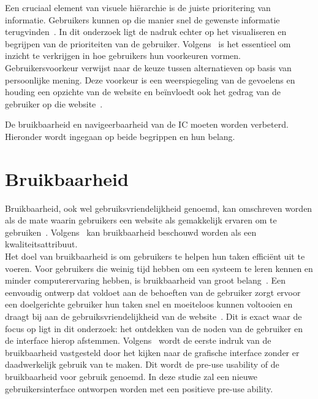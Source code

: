 Een cruciaal element van visuele hiërarchie is de juiste prioritering van informatie. Gebruikers kunnen op die manier snel de gewenste informatie terugvinden~\autocite{Raghavendra2024}. In dit onderzoek ligt de nadruk echter op het visualiseren en begrijpen van de prioriteiten van de gebruiker. Volgens~\textcite{Lee2010} is het essentieel om inzicht te verkrijgen in hoe gebruikers hun voorkeuren vormen. Gebruikersvoorkeur verwijst naar de keuze tussen alternatieven op basis van persoonlijke mening. Deze voorkeur is een weerspiegeling van de gevoelens en houding een opzichte van de website en beïnvloedt ook het gedrag van de gebruiker op die website~\autocite{Lee2010}.\par
\bigskip
De bruikbaarheid en navigeerbaarheid van de IC moeten worden verbeterd. Hieronder wordt ingegaan op beide begrippen en hun belang.
\section{Bruikbaarheid}
Bruikbaarheid, ook wel gebruiksvriendelijkhe\-id genoemd, kan omschreven worden als de mate waarin gebruikers een website als gemakkelijk ervaren om te gebruiken~\autocite{Dianat2019}. Volgens~\textcite{Dingli2014} kan bruikbaarheid beschouwd worden als een kwaliteitsattribuut.\\Het doel van bruikbaarheid is om gebruikers te helpen hun taken efficiënt uit te voeren. Voor gebruikers die weinig tijd hebben om een systeem te leren kennen en minder computerervaring hebben, is bruikbaarheid van groot belang~\autocite{Mazumder2014}. Een eenvoudig ontwerp dat voldoet aan de behoeften van de gebruiker zorgt ervoor een doelgerichte gebruiker hun taken snel en moeiteloos kunnen voltooien en draagt bij aan de gebruiksvriendelijkheid van de website~\autocite{Pearson2007}. Dit is exact waar de focus op ligt in dit onderzoek: het ontdekken van de noden van de gebruiker en de interface hierop afstemmen. Volgens~\textcite{Zachrison2022} wordt de eerste indruk van de bruikbaarheid vastgesteld door het kijken naar de grafische interface zonder er daadwerkelijk gebruik van te maken. Dit wordt de pre-use usability of de bruikbaarheid voor gebruik genoemd. In deze studie zal een nieuwe gebruikersinterface ontworpen worden met een positieve pre-use ability.

